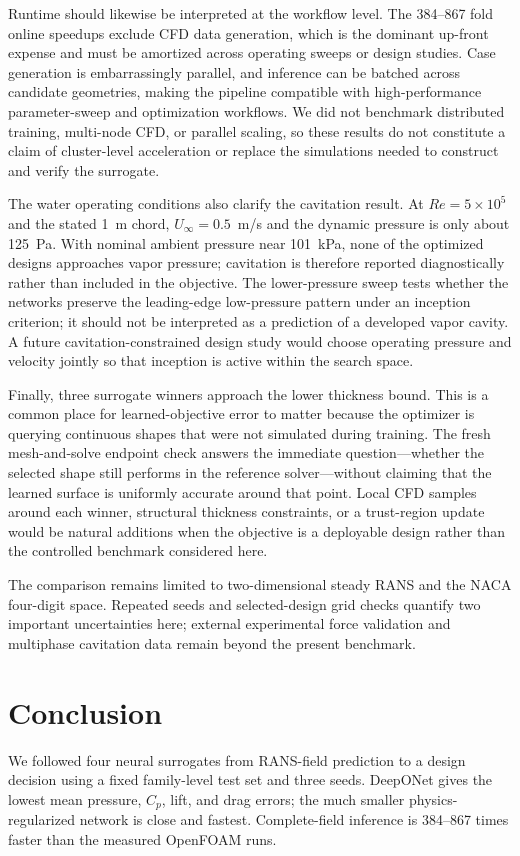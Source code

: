 \documentclass[conference]{IEEEtran}
\begin{document}
Runtime should likewise be interpreted at the workflow level. The 384--867
fold online speedups exclude CFD data generation, which is the dominant
up-front expense and must be amortized across operating sweeps or design
studies. Case generation is embarrassingly parallel, and inference can be
batched across candidate geometries, making the pipeline compatible with
high-performance parameter-sweep and optimization workflows. We did not
benchmark distributed training, multi-node CFD, or parallel scaling, so these
results do not constitute a claim of cluster-level acceleration or replace the
simulations needed to construct and verify the surrogate.

The water operating conditions also clarify the cavitation result. At
$Re=5\times10^5$ and the stated 1~m chord, $U_\infty=0.5$~m/s and the dynamic
pressure is only about 125~Pa. With nominal ambient pressure near 101~kPa, none
of the optimized designs approaches vapor pressure; cavitation is therefore
reported diagnostically rather than included in the objective. The lower-pressure sweep tests whether the
networks preserve the leading-edge low-pressure pattern under an inception
criterion; it should not be interpreted as a prediction of a developed vapor
cavity. A future cavitation-constrained design study would choose operating
pressure and velocity jointly so that inception is active within the search
space.

Finally, three surrogate winners approach the lower thickness bound. This is a
common place for learned-objective error to matter because the optimizer is
querying continuous shapes that were not simulated during training. The fresh
mesh-and-solve endpoint check answers the immediate question---whether the
selected shape still performs in the reference solver---without claiming that
the learned surface is uniformly accurate around that point. Local CFD samples
around each winner, structural thickness constraints, or a trust-region update
would be natural additions when the objective is a deployable design rather
than the controlled benchmark considered here.

The comparison remains limited to two-dimensional steady RANS and the NACA
four-digit space. Repeated seeds and selected-design grid checks quantify two
important uncertainties here; external experimental force validation and
multiphase cavitation data remain beyond the present benchmark.

\section{Conclusion}
We followed four neural surrogates from RANS-field prediction to a design
decision using a fixed family-level test set and three seeds. DeepONet gives
the lowest mean pressure, $C_p$, lift, and drag errors; the much smaller
physics-regularized network is close and fastest. Complete-field inference is
384--867 times faster than the measured OpenFOAM runs.
\end{document}
